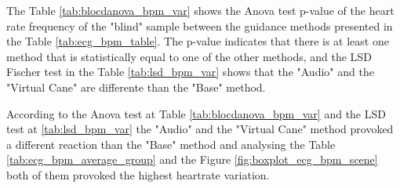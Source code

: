 The Table \ref{tab:blocdanova_bpm_var} shows the Anova test p-value of the heart rate frequency of the "blind" sample between the guidance methods presented in the Table \ref{tab:ecg_bpm_table}. The p-value indicates that there is at least one method that is statistically equal to one of the other methods, and the LSD Fischer test in the Table \ref{tab:lsd_bpm_var} shows that the "Audio" and the "Virtual Cane" are differente than the "Base" method.





According to the Anova test at Table \ref{tab:blocdanova_bpm_var} and the LSD test at \ref{tab:lsd_bpm_var} the "Audio" and the "Virtual Cane" method provoked a different reaction than the "Base" method and analysing the Table \ref{tab:ecg_bpm_average_group} and the Figure \ref{fig:boxplot_ecg_bpm_scene} both of them provoked the highest heartrate variation.

\FloatBarrier